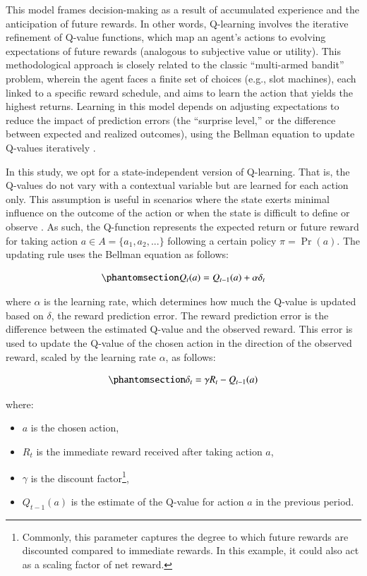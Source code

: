 \documentclass[
  number,
  preprint,
  3p,
  onecolumn]{elsarticle}
\begin{document}
This model frames decision-making as a result of accumulated experience
and the anticipation of future rewards. In other words, Q-learning
involves the iterative refinement of Q-value functions, which map an
agent's actions to evolving expectations of future rewards (analogous to
subjective value or utility). This methodological approach is closely
related to the classic ``multi-armed bandit'' problem, wherein the agent
faces a finite set of choices (e.g., slot machines), each linked to a
specific reward schedule, and aims to learn the action that yields the
highest returns. Learning in this model depends on adjusting
expectations to reduce the impact of prediction errors (the ``surprise
level,'' or the difference between expected and realized outcomes),
using the Bellman equation to update Q-values iteratively
\citep{rummery}.

In this study, we opt for a state-independent version of Q-learning.
That is, the Q-values do not vary with a contextual variable but are
learned for each action only. This assumption is useful in scenarios
where the state exerts minimal influence on the outcome of the action or
when the state is difficult to define or observe \citep{sutton2018}. As
such, the Q-function represents the expected return or future reward for
taking action \(a \in A = \{a_1,a_2,...\}\) following a certain policy
\(\pi = \Pr(a)\). The updating rule uses the Bellman equation as
follows:

\begin{equation}\phantomsection\label{eq-q-learn}{
Q_{t}(a) = Q_{t-1}(a) + \alpha \delta_t
}\end{equation}

where \(\alpha\) is the learning rate, which determines how much the
Q-value is updated based on \(\delta\), the reward prediction error. The
reward prediction error is the difference between the estimated Q-value
and the observed reward. This error is used to update the Q-value of the
chosen action in the direction of the observed reward, scaled by the
learning rate \(\alpha\), as follows:

\begin{equation}\phantomsection\label{eq-RPE}{
\delta_t = \gamma R_t - Q_{t-1}(a)
}\end{equation}

where:

\begin{itemize}
\item
  \(a\) is the chosen action,
\item
  \(R_t\) is the immediate reward received after taking action \(a\),
\item
  \(\gamma\) is the discount factor\footnote{Commonly, this parameter
    captures the degree to which future rewards are discounted compared
    to immediate rewards. In this example, it could also act as a
    scaling factor of net reward.},
\item
  \(Q_{t-1}(a)\) is the estimate of the Q-value for action \(a\) in the
  previous period.
\end{itemize}
\end{document}
